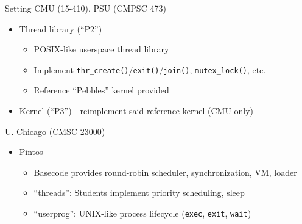 \documentclass[xcolor=dvipsnames]{beamer}
\begin{document}
\begin{frame}{Setting}
	CMU (15-410), PSU (CMPSC 473)
	\begin{itemize}
		\item Thread library (``P2'')
			\begin{itemize}
				\item POSIX-like userspace thread library %
				\item Implement {\tt thr\_create()}/{\tt exit()}/{\tt join()}, {\tt mutex\_lock()}, etc.
				\item Reference ``Pebbles'' kernel provided
			\end{itemize}
		\item Kernel (``P3'') - reimplement said reference kernel (CMU only)
	\end{itemize}
	\pause
	\linegap

	U. Chicago (CMSC 23000)
	\begin{itemize}
		\item Pintos %
		\begin{itemize}
			\item Basecode provides round-robin scheduler, synchronization, VM, loader
			\item ``threads'': Students implement priority scheduling, sleep

			\item ``userprog'': UNIX-like process lifecycle
				({\tt exec}, %
				{\tt exit}, {\tt wait})
		\end{itemize}
	\end{itemize}
\end{frame}
\end{document}
